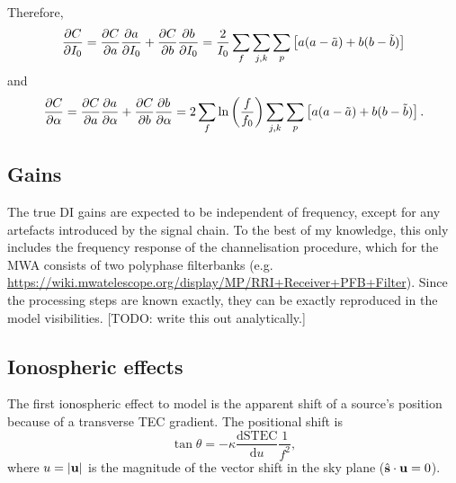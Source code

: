 \documentclass{book}
\newcommand{\deriv}[2]{\frac{\text{d}{#1}}{\text{d}{#2}}}
\newcommand{\pd}[2]{\frac{\partial {#1}}{\partial {#2}}}
\newcommand{\shat}{\hat{\bf s}}
\begin{document}
Therefore,
\begin{equation}
   \pd{C}{I_0}
       = \pd{C}{a} \pd{a}{I_0} + \pd{C}{b} \pd{b}{I_0} \\
       = \frac{2}{I_0}\sum_f \sum_{j,k} \sum_p \left[
           a(a - \tilde{a}) +
           b(b - \tilde{b})
           \right]
\end{equation}
and
\begin{equation}
   \pd{C}{\alpha}
       = \pd{C}{a} \pd{a}{\alpha} + \pd{C}{b} \pd{b}{\alpha} \\
       = 2 \sum_f \ln \left( \frac{f}{f_0} \right) \sum_{j,k} \sum_p \left[
           a(a - \tilde{a}) +
           b(b - \tilde{b})
           \right].
\end{equation}

\subsection{Gains}

The true DI gains are expected to be independent of frequency, except for any artefacts introduced by the signal chain.
To the best of my knowledge, this only includes the frequency response of the channelisation procedure, which for the MWA consists of two polyphase filterbanks (e.g. \url{https://wiki.mwatelescope.org/display/MP/RRI+Receiver+PFB+Filter}).
Since the processing steps are known exactly, they can be exactly reproduced in the model visibilities.
[TODO: write this out analytically.]

\subsection{Ionospheric effects}

The first ionospheric effect to model is the apparent shift of a source's position because of a transverse TEC gradient.
The positional shift is
\begin{equation}
    \tan\theta = -\kappa\deriv{\text{STEC}}{u} \frac{1}{f^2},
\end{equation}
where $u = |{\bf u}|$ is the magnitude of the vector shift in the sky plane ($\shat\cdot{\bf u} = 0$).
\end{document}
